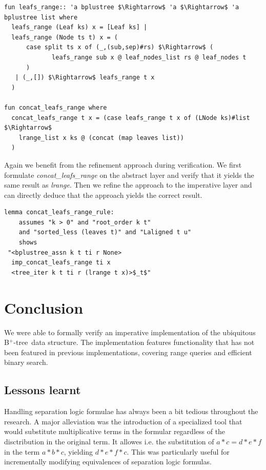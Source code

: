 \documentclass[a4paper,UKenglish,cleveref, autoref, thm-restate]{lipics-v2021}
\newcommand{\btree}{B$^+$-tree}
\begin{document}
\begin{lstlisting}[mathescape=true, language=Isabelle,label=lst:btree-leafs-range]
fun leafs_range:: 'a bplustree $\Rightarrow$ 'a $\Rightarrow$ 'a bplustree list where
  leafs_range (Leaf ks) x = [Leaf ks] |
  leafs_range (Node ts t) x = (
      case split ts x of (_,(sub,sep)#rs) $\Rightarrow$ (
             leafs_range sub x @ leaf_nodes_list rs @ leaf_nodes t
      )
   | (_,[]) $\Rightarrow$ leafs_range t x
  )

fun concat_leafs_range where
  concat_leafs_range t x = (case leafs_range t x of (LNode ks)#list $\Rightarrow$
    lrange_list x ks @ (concat (map leaves list))
  )
\end{lstlisting}

Again we benefit from the refinement approach during verification.
We first formulate \emph{concat\_leafs\_range} on the abstract layer
and verify that it yields the same result as \emph{lrange}.
Then we refine the approach to the imperative layer
and can directly deduce that the approach yields the correct result.

\begin{lstlisting}[mathescape=true, language=Isabelle,label=lst:btree-leafs-range]
lemma concat_leafs_range_rule:
    assumes "k > 0" and "root_order k t" 
    and "sorted_less (leaves t)" and "Laligned t u"
    shows 
 "<bplustree_assn k t ti r None>
  imp_concat_leafs_range ti x
  <tree_iter k t ti r (lrange t x)>$_t$"
\end{lstlisting}



\section{Conclusion}
\label{sec:conclusion}

We were able to formally verify an imperative implementation
of the ubiquitous \btree\ data structure.
The implementation features functionality that has not been 
featured in previous implementations,
covering range queries and efficient binary search.

\subsection{Lessons learnt}

Handling separation logic formulae has always been
a bit tedious throughout the research.
A major alleviation was the introduction of a specialized tool
that would substitute multiplicative terms in the formular
regardless of the disctribution in the original term.
It allowes i.e. the substitution of $a * c = d * e * f$ in
the term $a * b * c$, yielding $d * e * f * c$.
This was particularly useful for incrementally
modifying equivalences of separation logic formulas.
\end{document}
